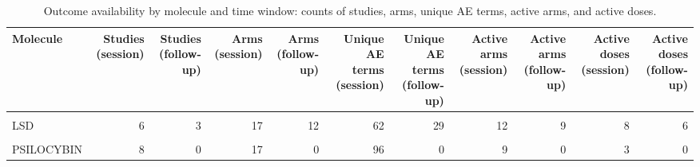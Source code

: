 \begin{table}[!h]
\centering
\caption{\label{tab:tab:outcome_availability_by_window}Outcome availability by molecule and time window: counts of studies, arms, unique AE terms, active arms, and active doses.}
\centering
\begin{tabular}[t]{lrrrrrrrrrr}
\toprule
Molecule & Studies (session) & Studies (follow-up) & Arms (session) & Arms (follow-up) & Unique AE terms (session) & Unique AE terms (follow-up) & Active arms (session) & Active arms (follow-up) & Active doses (session) & Active doses (follow-up)\\
\midrule
\cellcolor{gray!10}{AYAHUASCA} & \cellcolor{gray!10}{2} & \cellcolor{gray!10}{0} & \cellcolor{gray!10}{4} & \cellcolor{gray!10}{0} & \cellcolor{gray!10}{12} & \cellcolor{gray!10}{0} & \cellcolor{gray!10}{2} & \cellcolor{gray!10}{0} & \cellcolor{gray!10}{1} & \cellcolor{gray!10}{0}\\
LSD & 6 & 3 & 17 & 12 & 62 & 29 & 12 & 9 & 8 & 6\\
\cellcolor{gray!10}{MDMA} & \cellcolor{gray!10}{10} & \cellcolor{gray!10}{3} & \cellcolor{gray!10}{23} & \cellcolor{gray!10}{7} & \cellcolor{gray!10}{70} & \cellcolor{gray!10}{22} & \cellcolor{gray!10}{12} & \cellcolor{gray!10}{4} & \cellcolor{gray!10}{5} & \cellcolor{gray!10}{2}\\
PSILOCYBIN & 8 & 0 & 17 & 0 & 96 & 0 & 9 & 0 & 3 & 0\\
\bottomrule
\end{tabular}
\end{table}
